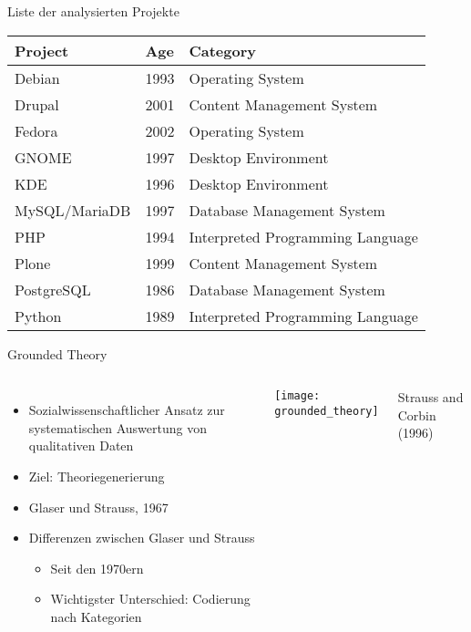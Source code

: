 \documentclass[11pt]{beamer}
\newcommand{\tableheadline}[1]{#1}
\begin{document}
\begin{frame}[t]{Liste der analysierten Projekte}
  \begin{center}
  \begin{tabularx}{\textwidth}{llX}
    \toprule
    \tableheadline{Project} & \tableheadline{Age} & \tableheadline{Category} \\
    \midrule
    Debian        & 1993 & Operating System \\
    Drupal        & 2001 & Content Management System \\
    Fedora        & 2002 & Operating System \\
    GNOME         & 1997 & Desktop Environment \\
    KDE           & 1996 & Desktop Environment \\
    MySQL/MariaDB & 1997 & Database Management System \\
    PHP           & 1994 & Interpreted Programming Language \\
    Plone         & 1999 & Content Management System \\
    PostgreSQL    & 1986 & Database Management System \\
    Python        & 1989 & Interpreted Programming Language \\
    \bottomrule
  \end{tabularx}

  \end{center}
\end{frame}

\begin{frame}[t]{Grounded Theory}
  \begin{columns}
    \begin{itemize}
      \item Sozialwissenschaftlicher Ansatz zur systematischen Auswertung von qualitativen Daten
      \item Ziel: Theoriegenerierung
      \item Glaser und Strauss, 1967
      \item Differenzen zwischen Glaser und Strauss
      \begin{itemize}
          \item Seit den 1970ern
          \item Wichtigster Unterschied: Codierung nach Kategorien
      \end{itemize}
    \end{itemize}
    \texttt{[image: grounded\_theory]}

    {\tiny\hfill
    Strauss and Corbin (1996)
    }
  \end{columns}
\end{frame}
\end{document}
